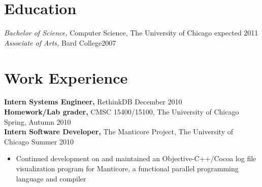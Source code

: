 \documentclass[line,overlapped]{res}
\begin{document}

\address{jordanthelewis@gmail.com \hspace{1.63in} Current: 5707 S. Kimbark Ave. Apt. 2, Chicago, IL 60637}
\address{(917) 974-7144 \hspace{2.81in} Permanent: 6 Warren Place, Brooklyn, NY 11201}


\newsectionwidth{.2in}
\begin{resume}

\section{Education}
{\sl Bachelor of Science,} Computer Science, The University of Chicago \hfill expected 2011\\
{\sl Associate of Arts,} Bard College\hfill 2007

\section{Work Experience}
{\bf Intern Systems Engineer,} RethinkDB \hfill December 2010\\
{\bf Homework/Lab grader,} CMSC 15400/15100, The University of Chicago \hfill Spring, Autumn 2010\\
{\bf Intern Software Developer,} The Manticore Project, The University of Chicago \hfill Summer 2010
\begin{itemize} \itemsep -2pt
    \item Continued development on and maintained an Objective-C++/Cocoa log file visualization program for Manticore, a functional parallel programming language and compiler
\end{itemize}

\vspace{-10pt}


\end{resume}
\end{document}
